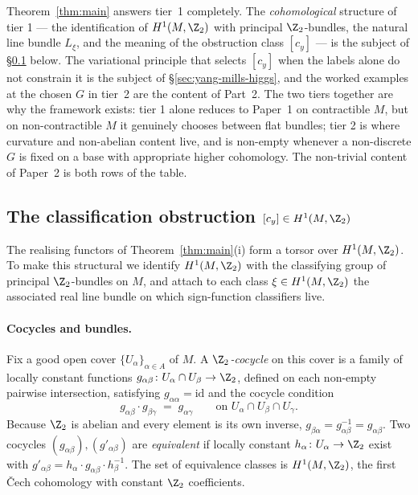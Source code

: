 Theorem~\ref{thm:main} answers tier~1 completely. The
\emph{cohomological} structure of tier 1 --- the identification of
$H^1(M,\Z_2)$ with principal $\Z_2$-bundles, the natural line bundle
$L_\xi$, and the meaning of the obstruction class $[c_y]$ --- is the
subject of \S\ref{ssec:obstruction} below. The variational principle
that selects $[c_y]$ when the labels alone do not constrain it is
the subject of \S\ref{sec:yang-mills-higgs}, and the worked examples
at the chosen $G$ in tier~2 are the content of Part~2. The two tiers
together are why the framework exists: tier 1 alone reduces to
Paper~1 on contractible $M$, but on non-contractible $M$ it
genuinely chooses between flat bundles; tier 2 is where curvature
and non-abelian content live, and is non-empty whenever a
non-discrete $G$ is fixed on a base with appropriate higher
cohomology. The non-trivial content of Paper~2 is both rows of the
table.

\subsection{The classification obstruction $[c_y]\in H^1(M,\Z_2)$}\label{ssec:obstruction}

The realising functors of Theorem~\ref{thm:main}(i) form a torsor
over $H^1(M,\Z_2)$. To make this structural we identify
$H^1(M,\Z_2)$ with the classifying group of principal $\Z_2$-bundles
on $M$, and attach to each class $\xi\in H^1(M,\Z_2)$ the associated
real line bundle on which sign-function classifiers live.

\paragraph{Cocycles and bundles.} Fix a good open cover
$\{U_\alpha\}_{\alpha\in A}$ of $M$. A \emph{$\Z_2$-cocycle} on this
cover is a family of locally constant functions
$g_{\alpha\beta}\colon U_\alpha\cap U_\beta\to\Z_2$, defined on each
non-empty pairwise intersection, satisfying $g_{\alpha\alpha}=
\mathrm{id}$ and the cocycle condition
\[
   g_{\alpha\beta}\cdot g_{\beta\gamma} \;=\; g_{\alpha\gamma}
   \qquad\text{on } U_\alpha\cap U_\beta\cap U_\gamma.
\]
Because $\Z_2$ is abelian and every element is its own inverse,
$g_{\beta\alpha}=g_{\alpha\beta}^{-1}=g_{\alpha\beta}$. Two cocycles
$(g_{\alpha\beta}),(g'_{\alpha\beta})$ are \emph{equivalent} if
locally constant $h_\alpha\colon U_\alpha\to\Z_2$ exist with
$g'_{\alpha\beta}=h_\alpha\cdot g_{\alpha\beta}\cdot h_\beta^{-1}$.
The set of equivalence classes is $H^1(M,\Z_2)$, the first
\v{C}ech cohomology with constant $\Z_2$ coefficients.

